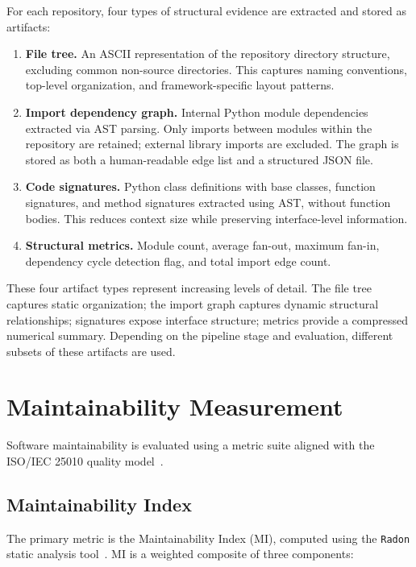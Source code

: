 For each repository, four types of structural evidence are extracted and stored as artifacts:

\begin{enumerate}
    \item \textbf{File tree.} An ASCII representation of the repository directory structure, excluding common non-source directories. This captures naming conventions, top-level organization, and framework-specific layout patterns.
    \\
    \item \textbf{Import dependency graph.} Internal Python module dependencies extracted via AST parsing. Only imports between modules within the repository are retained; external library imports are excluded. The graph is stored as both a human-readable edge list and a structured JSON file.

    \item \textbf{Code signatures.} Python class definitions with base classes, function signatures, and method signatures extracted using AST, without function bodies. This reduces context size while preserving interface-level information.

    \item \textbf{Structural metrics.} Module count, average fan-out, maximum fan-in, dependency cycle detection flag, and total import edge count.
\end{enumerate}

These four artifact types represent increasing levels of detail. The file tree captures static organization; the import graph captures dynamic structural relationships; signatures expose interface structure; metrics provide a compressed numerical summary. Depending on the pipeline stage and evaluation, different subsets of these artifacts are used.

\section{Maintainability Measurement}
\label{sec:met_measurement}

Software maintainability is evaluated using a metric suite aligned with the ISO/IEC 25010 quality model~\cite{ISO25010}.

\subsection{Maintainability Index}

The primary metric is the Maintainability Index (MI), computed using the \texttt{Radon} static analysis tool~\cite{oman1992maintainability}. MI is a weighted composite of three components:

